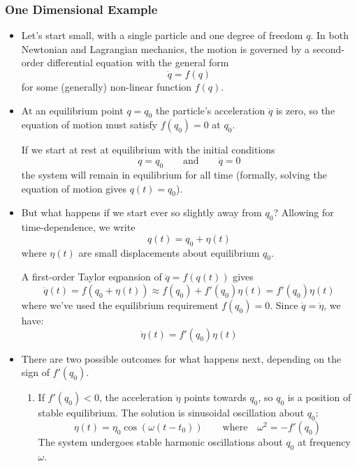 \documentclass[11pt, a4paper]{article}
\newcommand{\eqtext}[1]{\qquad \text{#1} \qquad}
\begin{document}
\subsubsection{One Dimensional Example}
\begin{itemize}

	\item Let's start small, with a single particle and one degree of freedom $ q $. In both Newtonian and Lagrangian mechanics, the motion is governed by a second-order differential equation with the general form
	\begin{equation*}
		\ddot{q} = f(q)
	\end{equation*}
	for some (generally) non-linear function $ f(q) $.
	
	\item At an equilibrium point $ q = q_{0} $ the particle's acceleration $ \ddot{q} $ is zero, so the equation of motion must satisfy $ f(q_{0}) = 0$ at $ q_{0} $. 
	
	If we start at rest at equilibrium with the initial conditions 
	\begin{equation*}
		q = q_{0} \eqtext{and} \dot{q} = 0
	\end{equation*}
	the system will remain in equilibrium for all time (formally, solving the equation of motion gives $ q(t) = q_{0} $).
	
	\item But what happens if we start ever so slightly away from $ q_{0} $? Allowing for time-dependence, we write
	\begin{equation*}
		q(t) = q_0 + \eta(t)
	\end{equation*}
	where $ \eta(t) $ are small displacements about equilibrium $ q_{0} $. 
	
	A first-order Taylor eqpansion of $ \ddot{q} = f(q(t)) $ gives 
	\begin{equation*}
		 \ddot{q}(t) = f( q_0 + \eta(t)) \approx f(q_{0}) + f'(q_0) \eta(t) = f'(q_{0})\eta(t)
	\end{equation*}
	where we've used the equilibrium requirement $  f(q_{0}) = 0 $. Since $ \ddot{q} = \ddot{\eta} $, we have:
	\begin{equation*}
		\ddot{\eta} (t) = f'(q_{0})\eta(t)
	\end{equation*}
	
	\item There are two possible outcomes for what happens next, depending on the sign of $ f'(q_{0}) $.
	\begin{enumerate}
		\item If $ f'(q_0) < 0$, the acceleration $ \ddot{\eta} $ points towards $ q_0 $, so $ q_0 $ is a position of stable equilibrium. The solution is sinusoidal oscillation about $ q_0 $:
		\begin{equation*}
			 \eta(t) = \eta_0 \cos (\omega (t - t_0) ) \qquad \text{where} \quad \omega^2 = - f'(q_0)
		\end{equation*}
		The system undergoes stable harmonic oscillations about $ q_{0} $ at frequency $ \omega $.
		

\end{enumerate}
\end{itemize}
\end{document}
